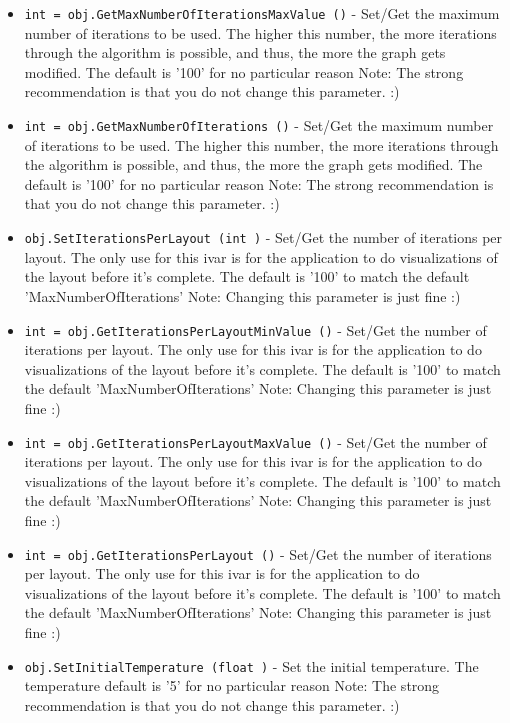 \begin{itemize}
\item  \verb|int = obj.GetMaxNumberOfIterationsMaxValue ()| -  Set/Get the maximum number of iterations to be used.
 The higher this number, the more iterations through the algorithm
 is possible, and thus, the more the graph gets modified.
 The default is '100' for no particular reason
 Note: The strong recommendation is that you do not change
 this parameter. :)

\item  \verb|int = obj.GetMaxNumberOfIterations ()| -  Set/Get the maximum number of iterations to be used.
 The higher this number, the more iterations through the algorithm
 is possible, and thus, the more the graph gets modified.
 The default is '100' for no particular reason
 Note: The strong recommendation is that you do not change
 this parameter. :)

\item  \verb|obj.SetIterationsPerLayout (int )| -  Set/Get the number of iterations per layout.
 The only use for this ivar is for the application
 to do visualizations of the layout before it's complete.
 The default is '100' to match the default 'MaxNumberOfIterations'
 Note: Changing this parameter is just fine :)

\item  \verb|int = obj.GetIterationsPerLayoutMinValue ()| -  Set/Get the number of iterations per layout.
 The only use for this ivar is for the application
 to do visualizations of the layout before it's complete.
 The default is '100' to match the default 'MaxNumberOfIterations'
 Note: Changing this parameter is just fine :)

\item  \verb|int = obj.GetIterationsPerLayoutMaxValue ()| -  Set/Get the number of iterations per layout.
 The only use for this ivar is for the application
 to do visualizations of the layout before it's complete.
 The default is '100' to match the default 'MaxNumberOfIterations'
 Note: Changing this parameter is just fine :)

\item  \verb|int = obj.GetIterationsPerLayout ()| -  Set/Get the number of iterations per layout.
 The only use for this ivar is for the application
 to do visualizations of the layout before it's complete.
 The default is '100' to match the default 'MaxNumberOfIterations'
 Note: Changing this parameter is just fine :)

\item  \verb|obj.SetInitialTemperature (float )| -  Set the initial temperature.  The temperature default is '5'
 for no particular reason
 Note: The strong recommendation is that you do not change
 this parameter. :)


\end{itemize}
